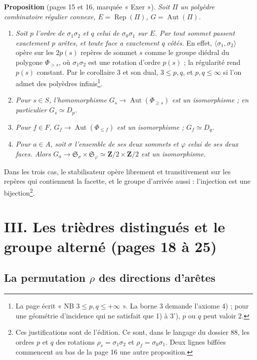 \documentclass[11pt,a4paper]{article}
\begin{document}
\textbf{Proposition} (pages 15 et 16, marquée « Exer »). \emph{Soit $\Pi$ un
polyèdre combinatoire régulier connexe, $E = \operatorname{Rep}(\Pi)$, $G =
\operatorname{Aut}(\Pi)$.}
\begin{enumerate}
  \item[a)] \emph{Soit $p$ l'ordre de $\sigma_1\sigma_2$ et $q$ celui de
    $\sigma_0\sigma_1$ sur $E$. Par tout sommet passent exactement $p$ arêtes,
    et toute face a exactement $q$ côtés.} En effet, $\langle \sigma_1, \sigma_2
    \rangle$ opère sur les $2p(s)$ repères de sommet $s$ comme le groupe diédral
    du polygone $\Phi_{>s}$, où $\sigma_1\sigma_2$ est une rotation d'ordre
    $p(s)$ ; la régularité rend $p(s)$ constant. Par le corollaire 3 et son
    dual, $3 \leq p, q$, et $p, q \leq \infty$ si l'on admet des polyèdres
    infinis\footnote{La page écrit « NB $3 \leq p, q \leq +\infty$ ». La borne
    $3$ demande l'axiome 4) ; pour une géométrie d'incidence qui ne satisfait que
    1) à 3'), $p$ ou $q$ peut valoir $2$.}.
  \item[b)] \emph{Pour $s \in S$, l'homomorphisme $G_s \to
    \operatorname{Aut}(\Phi_{\geq s})$ est un isomorphisme ; en particulier
    $G_s \simeq D_p$.}
  \item[b')] \emph{Pour $f \in F$, $G_f \to \operatorname{Aut}(\Phi_{\leq f})$
    est un isomorphisme ; $G_f \simeq D_q$.}
  \item[c)] \emph{Pour $a \in A$, soit $\sigma$ l'ensemble de ses deux sommets
    et $\varphi$ celui de ses deux faces. Alors $G_a \to \mathfrak{S}_\sigma
    \times \mathfrak{S}_\varphi \simeq \mathbf{Z}/2 \times \mathbf{Z}/2$ est un
    isomorphisme.}
\end{enumerate}
Dans les trois cas, le stabilisateur opère librement et transitivement sur les
repères qui contiennent la facette, et le groupe d'arrivée aussi : l'injection
est une bijection\footnote{Ces justifications sont de l'édition. Ce sont,
dans le langage du dossier 88, les ordres $p$ et $q$ des rotations $\rho_s =
\sigma_1\sigma_2$ et $\rho_f = \sigma_0\sigma_1$. Deux lignes biffées commencent
au bas de la page 16 une autre proposition.}.

\section*{III. Les trièdres distingués et le groupe alterné (pages 18 à 25)}

\subsection*{La permutation $\rho$ des directions d'arêtes}
\end{document}
